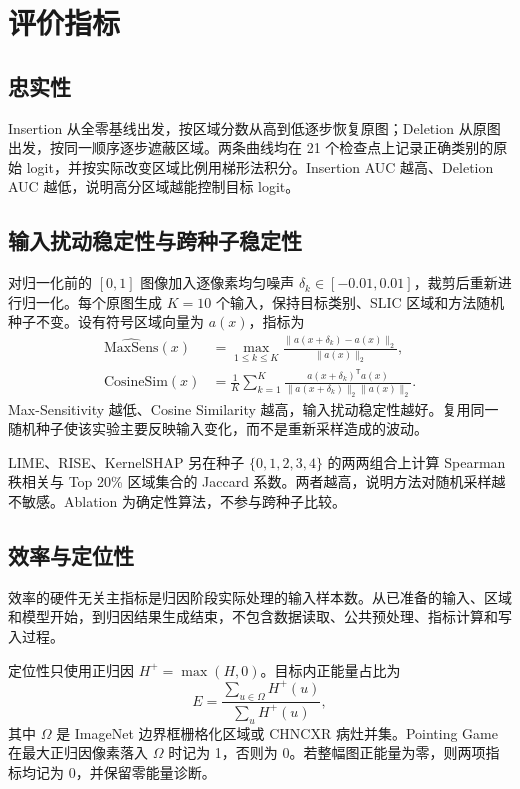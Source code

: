 \section{评价指标}

\subsection{忠实性}

Insertion 从全零基线出发，按区域分数从高到低逐步恢复原图；Deletion 从原图出发，按同一顺序逐步遮蔽区域。两条曲线均在 21 个检查点上记录正确类别的原始 logit，并按实际改变区域比例用梯形法积分。Insertion AUC 越高、Deletion AUC 越低，说明高分区域越能控制目标 logit。

\subsection{输入扰动稳定性与跨种子稳定性}

对归一化前的 $[0,1]$ 图像加入逐像素均匀噪声 $\delta_k\in[-0.01,0.01]$，裁剪后重新进行归一化。每个原图生成 $K=10$ 个输入，保持目标类别、SLIC 区域和方法随机种子不变。设有符号区域向量为 $a(x)$，指标为
\[
\begin{aligned}
    \widehat{\mathrm{MaxSens}}(x)
    &=\max_{1\le k\le K}\frac{\lVert a(x+\delta_k)-a(x)\rVert_2}{\lVert a(x)\rVert_2},\\
    \mathrm{CosineSim}(x)
    &=\frac{1}{K}\sum_{k=1}^{K}
    \frac{a(x+\delta_k)^{\mathsf T}a(x)}
    {\lVert a(x+\delta_k)\rVert_2\lVert a(x)\rVert_2}.
\end{aligned}
\]
Max-Sensitivity 越低、Cosine Similarity 越高，输入扰动稳定性越好。复用同一随机种子使该实验主要反映输入变化，而不是重新采样造成的波动。

LIME、RISE、KernelSHAP 另在种子 $\{0,1,2,3,4\}$ 的两两组合上计算 Spearman 秩相关与 Top 20\% 区域集合的 Jaccard 系数。两者越高，说明方法对随机采样越不敏感。Ablation 为确定性算法，不参与跨种子比较。

\subsection{效率与定位性}

效率的硬件无关主指标是归因阶段实际处理的输入样本数。从已准备的输入、区域和模型开始，到归因结果生成结束，不包含数据读取、公共预处理、指标计算和写入过程。

定位性只使用正归因 $H^+=\max(H,0)$。目标内正能量占比为
\[
    E=\frac{\sum_{u\in\Omega}H^+(u)}{\sum_u H^+(u)},
\]
其中 $\Omega$ 是 ImageNet 边界框栅格化区域或 CHNCXR 病灶并集。Pointing Game 在最大正归因像素落入 $\Omega$ 时记为 1，否则为 0。若整幅图正能量为零，则两项指标均记为 0，并保留零能量诊断。


